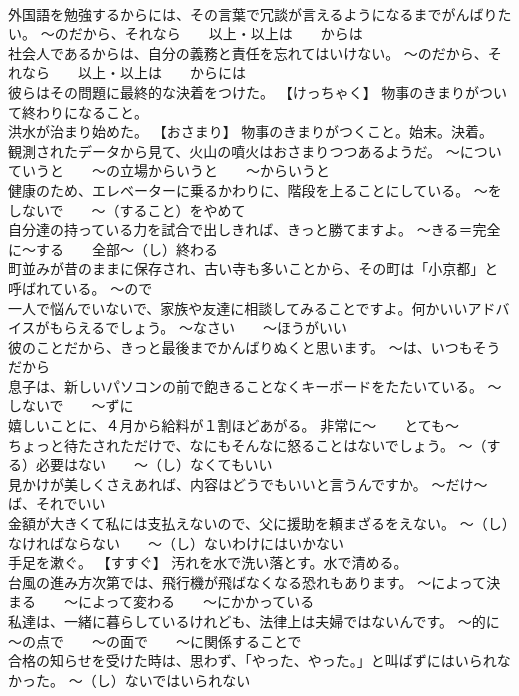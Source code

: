\documentclass[8pt]{extreport}
\begin{document}
\begin{CJK}{UTF8}{min}
\\	外国語を勉強するからには、その言葉で冗談が言えるようになるまでがんばりたい。	～のだから、それなら　　以上・以上は　　からは
\\	社会人であるからは、自分の義務と責任を忘れてはいけない。	～のだから、それなら　　以上・以上は　　からには
\\	彼らはその問題に最終的な決着をつけた。	【けっちゃく】 物事のきまりがついて終わりになること。
\\	洪水が治まり始めた。	【おさまり】 物事のきまりがつくこと。始末。決着。
\\	観測されたデータから見て、火山の噴火はおさまりつつあるようだ。	～についていうと　　～の立場からいうと　　～からいうと
\\	健康のため、エレベーターに乗るかわりに、階段を上ることにしている。	～をしないで　　～（すること）をやめて
\\	自分達の持っている力を試合で出しきれば、きっと勝てますよ。	～きる＝完全に～する　　全部～（し）終わる
\\	町並みが昔のままに保存され、古い寺も多いことから、その町は「小京都」と呼ばれている。	～ので
\\	一人で悩んでいないで、家族や友達に相談してみることですよ。何かいいアドバイスがもらえるでしょう。	～なさい　　～ほうがいい
\\	彼のことだから、きっと最後までかんばりぬくと思います。	～は、いつもそうだから
\\	息子は、新しいパソコンの前で飽きることなくキーボードをたたいている。	～しないで　　～ずに
\\	嬉しいことに、４月から給料が１割ほどあがる。	非常に～　　とても～
\\	ちょっと待たされただけで、なにもそんなに怒ることはないでしょう。	～（する）必要はない　　～（し）なくてもいい
\\	見かけが美しくさえあれば、内容はどうでもいいと言うんですか。	～だけ～ば、それでいい
\\	金額が大きくて私には支払えないので、父に援助を頼まざるをえない。	～（し）なければならない　　～（し）ないわけにはいかない
\\	手足を漱ぐ。	【すすぐ】 汚れを水で洗い落とす。水で清める。
\\	台風の進み方次第では、飛行機が飛ばなくなる恐れもあります。	～によって決まる　　～によって変わる　　～にかかっている
\\	私達は、一緒に暮らしているけれども、法律上は夫婦ではないんです。	～的に　　～の点で　　～の面で　　～に関係することで
\\	合格の知らせを受けた時は、思わず、「やった、やった。」と叫ばずにはいられなかった。	～（し）ないではいられない

\end{CJK}
\end{document}
